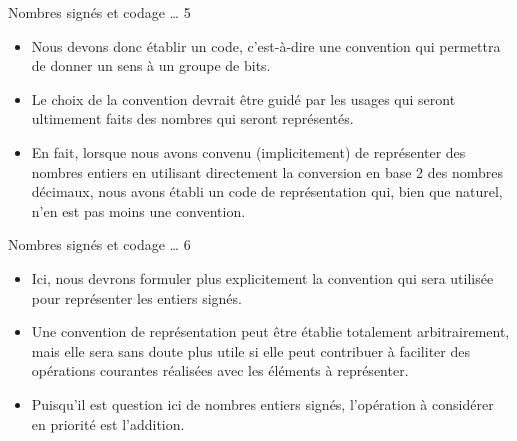 \documentclass[presentation]{beamer}
\begin{document}
\begin{frame}[label={sec:orgb332579}]{Nombres signés et codage \ldots{} 5}
\begin{itemize}
\item Nous devons donc établir un \alert{code}, c'est-à-dire une \alert{convention} qui permettra de donner un sens à un groupe de bits.

\item Le choix de la convention devrait être guidé par les usages qui seront ultimement faits des nombres qui seront représentés.

\item En fait, lorsque nous avons convenu (implicitement) de représenter des nombres entiers en utilisant directement la conversion en base 2 des nombres décimaux, nous avons établi un code de représentation qui, bien que naturel, n'en est pas moins une convention.
\end{itemize}
\end{frame}

\begin{frame}[label={sec:org009cfda}]{Nombres signés et codage \ldots{} 6}
\begin{itemize}
\item Ici, nous devrons formuler plus explicitement la convention qui sera utilisée pour représenter les entiers signés.

\item Une convention de représentation peut être établie totalement arbitrairement, mais elle sera sans doute plus utile si elle peut contribuer à faciliter des opérations courantes réalisées avec les éléments à représenter.

\item Puisqu'il est question ici de nombres entiers signés, l'opération à considérer en priorité est l'addition.
\end{itemize}
\end{frame}
\end{document}
